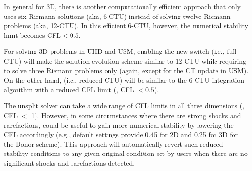 \begin{itemize}
In general for 3D, there is another computationally efficient approach that only uses six Riemann solutions (aka, 6-CTU)
instead of solving twelve Riemann problems (aka, 12-CTU). In this efficient 6-CTU, however, 
the numerical stability limit becomes CFL$<0.5$. 

For solving 3D problems in UHD and USM, enabling the new switch  (i.e., full-CTU) will make 
the solution evolution scheme similar to 12-CTU while requiring to solve three Riemann problems only
(again, except for the CT update in USM). On the other hand,  (i.e., reduced-CTU) will be
similar to the 6-CTU integration algorithm with a reduced CFL limit (\ie, CFL $<0.5$).
\end{itemize}



\begin{flashtip}
The unsplit solver can take a wide range of CFL limits in all three dimensions (\ie, CFL $<$ 1). 
However, in some circumstances where there are strong shocks and rarefactions,  could be useful to gain more numerical
stability by lowering the CFL accordingly 
(e.g., default settings provide 0.45 for 2D and 0.25 for 3D for the Donor scheme).
This approach will automatically revert such reduced 
stability conditions to any given original condition set by users when there are no significant shocks and rarefactions detected.
\end{flashtip}



